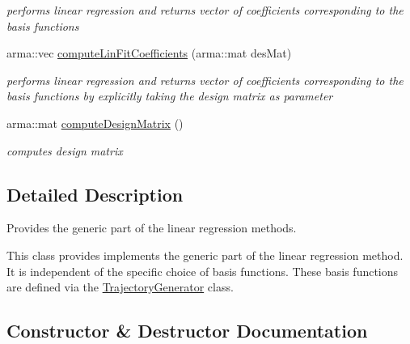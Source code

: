 \begin{DoxyCompactItemize}
\begin{DoxyCompactList}\small\item\em performs linear regression and returns vector of coefficients corresponding to the basis functions \end{DoxyCompactList}\item 
arma\+::vec \hyperlink{classkukadu_1_1GeneralFitter_ababdab99ea68030d3fa7b5cd692e4372}{compute\+Lin\+Fit\+Coefficients} (arma\+::mat des\+Mat)
\begin{DoxyCompactList}\small\item\em performs linear regression and returns vector of coefficients corresponding to the basis functions by explicitly taking the design matrix as parameter \end{DoxyCompactList}\item 
arma\+::mat \hyperlink{classkukadu_1_1GeneralFitter_aa1b7d37f59d0c86185425ec550e6c1b0}{compute\+Design\+Matrix} ()\hypertarget{classkukadu_1_1GeneralFitter_aa1b7d37f59d0c86185425ec550e6c1b0}{}\label{classkukadu_1_1GeneralFitter_aa1b7d37f59d0c86185425ec550e6c1b0}

\begin{DoxyCompactList}\small\item\em computes design matrix \end{DoxyCompactList}\end{DoxyCompactItemize}


\subsection{Detailed Description}
Provides the generic part of the linear regression methods. 

This class provides implements the generic part of the linear regression method. It is independent of the specific choice of basis functions. These basis functions are defined via the \hyperlink{classkukadu_1_1TrajectoryGenerator}{Trajectory\+Generator} class. 

\subsection{Constructor \& Destructor Documentation}
